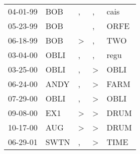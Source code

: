 \begin{supertabular}{p{0.07\textwidth}p{0.06\textwidth}p{0.02\textwidth}p{0.02\textwidth}p{0.06\textwidth}}
 04-01-99\textsuperscript{} &   BOB\textsuperscript{} &             , &             , &  cais\textsuperscript{} \\
 05-23-99\textsuperscript{} &   BOB\textsuperscript{} &               &             , &  ORFE\textsuperscript{} \\
 06-18-99\textsuperscript{} &   BOB\textsuperscript{} &  \textgreater &             , &   TWO\textsuperscript{} \\
 03-04-00\textsuperscript{} &  OBLI\textsuperscript{} &             , &             , &  regu\textsuperscript{} \\
 03-25-00\textsuperscript{} &  OBLI\textsuperscript{} &             , &  \textgreater &  OBLI\textsuperscript{} \\
 06-24-00\textsuperscript{} &  ANDY\textsuperscript{} &             , &  \textgreater &  FARM\textsuperscript{} \\
 07-29-00\textsuperscript{} &  OBLI\textsuperscript{} &             , &  \textgreater &  OBLI\textsuperscript{} \\
 09-08-00\textsuperscript{} &   EX1\textsuperscript{} &  \textgreater &  \textgreater &  DRUM\textsuperscript{} \\
 10-17-00\textsuperscript{} &   AUG\textsuperscript{} &  \textgreater &  \textgreater &  DRUM\textsuperscript{} \\
 06-29-01\textsuperscript{} &  SWTN\textsuperscript{} &             , &  \textgreater &  TIME\textsuperscript{} \\
\end{supertabular}
